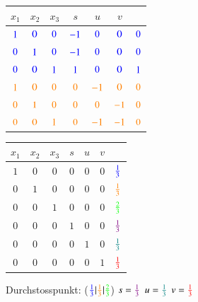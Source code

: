 \begin{minipage}[b]{0.49\columnwidth}
	\begin{tabular}{| c c c c c c | c |}
		\hline
		$x_1$ 		& $x_2$ 	& $x_3$ 	& $s$ 			& $u$ 			& $v$ 			& 			\\
		\hline
		${\color{blue}1}$ 	& ${\color{blue}0}$	& ${\color{blue}0}$	& ${\color{blue}-1}$	& ${\color{blue}0}$		& ${\color{blue}0}$		& ${\color{blue}0}$	\\
		${\color{blue}0}$ 	& ${\color{blue}1}$	& ${\color{blue}0}$	& ${\color{blue}-1}$	& ${\color{blue}0}$		& ${\color{blue}0}$		& ${\color{blue}0}$	\\
		${\color{blue}0}$ 	& ${\color{blue}0}$	& ${\color{blue}1}$	& ${\color{blue}1}$		& ${\color{blue}0}$		& ${\color{blue}0}$		& ${\color{blue}1}$	\\
		${\color{orange}1}$ 	& ${\color{orange}0}$	& ${\color{orange}0}$	& ${\color{orange}0}$		& ${\color{orange}-1}$	& ${\color{orange}0}$		& ${\color{orange}0}$	\\
		${\color{orange}0}$ 	& ${\color{orange}1}$	& ${\color{orange}0}$	& ${\color{orange}0}$		& ${\color{orange}0}$		& ${\color{orange}-1}$	& ${\color{orange}0}$	\\
		${\color{orange}0}$ 	& ${\color{orange}0}$	& ${\color{orange}1}$	& ${\color{orange}0}$		& ${\color{orange}-1}$	& ${\color{orange}-1}$	& ${\color{orange}0}$	\\
		\hline
	\end{tabular}	
\end{minipage}
\hfill
\begin{minipage}[b]{0.48\columnwidth}
	\renewcommand{\arraystretch}{1.2}
	\begin{tabular}{| c c c c c c | c |}
		\hline
		$x_1$ 	& $x_2$	& $x_3$	& $s$ 	& $u$ & $v$ & 									\\
		\hline
		$1$ 	& $0$ 	& $0$ 	& $0$ 	& $0$ & $0$ & ${\color{blue}\frac{1}{3}}$ 				\\
		$0$ 	& $1$ 	& $0$ 	& $0$ 	& $0$ & $0$ & ${\color{orange}\frac{1}{3}}$ 				\\
		$0$ 	& $0$ 	& $1$ 	& $0$ 	& $0$ & $0$ & ${\color{green}\frac{2}{3}}$ 				\\
		$0$ 	& $0$ 	& $0$ 	& $1$ 	& $0$ & $0$ & ${\color{violet}\frac{1}{3}}$ \\
		$0$ 	& $0$ 	& $0$ 	& $0$ 	& $1$ & $0$ & $\textcolor{teal}{\frac{1}{3}}$ 	\\
		$0$ 	& $0$ 	& $0$ 	& $0$ 	& $0$ & $1$ & ${\color{red}\frac{1}{3}}$ 				\\
		\hline
	\end{tabular}	
	\renewcommand{\arraystretch}{1}	
\end{minipage}

\vspace{0.2cm}

Durchstosspunkt: (${\color{blue}\frac{1}{3}} \vert {\color{orange}\frac{1}{3}} \vert {\color{green}\frac{2}{3}}$)
\quad $s = {\color{violet}\frac{1}{3}}$ \quad $u = \textcolor{teal}{\frac{1}{3}}$ \quad $v = {\color{red}\frac{1}{3}}$	
					
